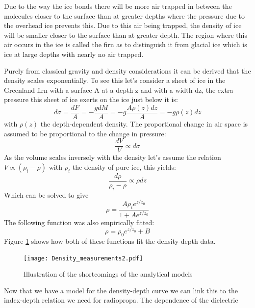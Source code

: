 Due to the way the ice bonds there will be more air trapped in between the
molecules closer to the surface than at greater depths where the pressure due
to the overhead ice prevents this.  Due to this air being trapped, the density
of ice will be smaller closer to the surface than at greater depth.  The region
where this air occurs in the ice is called the firn\cite{Firn} as to
distinguish it from glacial ice which is ice at large depths with nearly no air
trapped.

Purely from classical gravity and density considerations it can be derived that
the density scales exponentially. To see this let's consider a sheet of ice in
the Greenland firn with a surface A at a depth z and with a width dz, the extra
pressure this sheet of ice exerts on the ice just below it is:
\begin{equation}
	d\sigma = \frac{dF}{A} = -\frac{gdM}{A} = -g\frac{A\rho(z)dz}{A} = -g\rho(z)dz
\end{equation}
with $\rho(z)$ the depth-dependent density. The proportional change in air
space is assumed to be proportional to the change in
pressure\cite{herron_langway_1980}:
\begin{equation}
	\frac{dV}{V} \propto d\sigma
\end{equation}
As the volume scales inversely with the density let's assume the relation $V \propto (\rho_i - \rho)$ with
$\rho_i$ the density of pure ice, this yields:
\begin{equation}
	\frac{d\rho}{\rho_i - \rho} \propto \rho dz
\end{equation}
Which can be solved to give
\begin{equation}
	\rho = \frac{A\rho_i e^{z/z_0}}{1 + Ae^{z/z_0}}
\end{equation}
The following function was also empirically fitted:
\begin{equation}
	\label{eqn:myderiexp}
	\rho = \rho_0 e^{z/z_0} + B
\end{equation}
Figure \ref{fig:DensityMeasurements} shows how both of these functions fit the
density-depth data\cite{alley_koci_1988}\cite{hawley_morris_mcconnell_2008}.  
\begin{figure}
  \centering
	\texttt{[image: Density\_measurements2.pdf]}
	\caption{Illustration of the shortcomings of the analytical models}
	\label{fig:DensityMeasurements}
\end{figure}
Now that we have a model for the density-depth curve we can link this to the
index-depth relation we need for radiopropa.  The dependence of the dielectric
